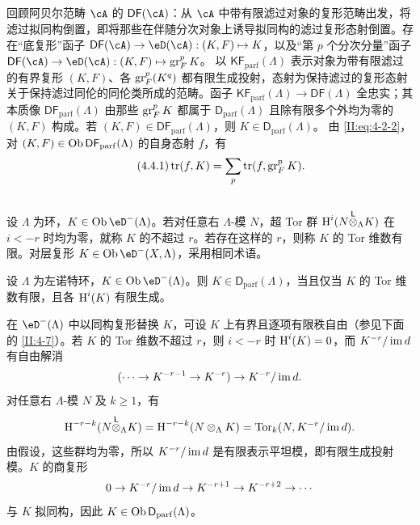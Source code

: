 \subsection{}\label{II:4-4}
回顾阿贝尔范畴 $\cA$ 的 $\mathsf{DF}(\cA)$：从 $\cA$ 中带有限滤过对象的复形范畴出发，将滤过拟同构倒置，即将那些在伴随分次对象上诱导拟同构的滤过复形态射倒置。存在“底复形”函子 $\mathsf{DF}(\cA)\to\eD(\cA):(K,F)\mapsto K$，以及“第 $p$ 个分次分量”函子 $\mathsf{DF}(\cA)\to\eD(\cA):(K,F)\mapsto\gr_F^pK$。
以 $\mathsf{KF}_{\mathrm{parf}}(\Lambda)$ 表示对象为带有限滤过的有界复形 $(K,F)$、各 $\operatorname{gr}_F^p(K^q)$ 都有限生成投射，态射为保持滤过的复形态射关于保持滤过同伦的同伦类所成的范畴。函子 $\mathsf{KF}_{\mathrm{parf}}(\Lambda)\to\mathsf{DF}(\Lambda)$ 全忠实；其本质像 $\mathsf{DF}_{\mathrm{parf}}(\Lambda)$ 由那些 $\operatorname{gr}_F^pK$ 都属于 $\mathsf D_{\mathrm{parf}}(\Lambda)$ 且除有限多个外均为零的 $(K,F)$ 构成。若 $(K,F)\in\mathsf{DF}_{\mathrm{parf}}(\Lambda)$，则 $K\in\mathsf D_{\mathrm{parf}}(\Lambda)$。
由 \eqref{II:eq:4-2-2}，对 $(K,F)\in\operatorname{Ob}\mathsf{DF}_{\mathrm{parf}}(\Lambda)$ 的自身态射 $f$，有
\begin{equation*}\tag{4.4.1}\label{II:eq:4-4-1}
\operatorname{tr}(f,K)=\sum_p\operatorname{tr}(f,\operatorname{gr}_F^pK).
\end{equation*}

\subsection{}\label{II:4-5}
设 $\Lambda$ 为环，$K\in\ob\eD^-(\Lambda)$。若对任意右 $\Lambda$-模 $N$，超 Tor 群 $\operatorname{H}^i(N{\overset{\mathsf{L}}{\otimes}}_\Lambda K)$ 在 $i<-r$ 时均为零，就称 $K$ 的不超过 $r$。若存在这样的 $r$，则称 $K$ 的 Tor 维数有限。对层复形 $K\in\ob\eD^-(X,\Lambda)$，采用相同术语。
\begin{lemma}\label{II:4-5-1}
设 $\Lambda$ 为左诺特环，$K\in\ob\eD^-(\Lambda)$。则 $K\in\mathsf D_{\mathrm{parf}}(\Lambda)$，当且仅当 $K$ 的 Tor 维数有限，且各 $\operatorname{H}^i(K)$ 有限生成。
\end{lemma}
在 $\eD^-(\Lambda)$ 中以同构复形替换 $K$，可设 $K$ 上有界且逐项有限秩自由（参见下面的 \ref{II:4-7}）。若 $K$ 的 Tor 维数不超过 $r$，则 $i<-r$ 时 $\operatorname{H}^i(K)=0$，而 $K^{-r}/\operatorname{im} d$ 有自由解消
\[(\cdots\to K^{-r-1}\to K^{-r})\to K^{-r}/\operatorname{im} d.\]
对任意右 $\Lambda$-模 $N$ 及 $k\geqslant1$，有
\[\operatorname{H}^{-r-k}(N{\overset{\mathsf{L}}{\otimes}}_\Lambda K)=\operatorname{H}^{-r-k}(N\otimes_\Lambda K)=\operatorname{Tor}_k(N,K^{-r}/\operatorname{im} d).\]
由假设，这些群均为零，所以 $K^{-r}/\operatorname{im} d$ 是有限表示平坦模，即有限生成投射模。$K$ 的商复形
\[0\to K^{-r}/\operatorname{im} d\to K^{-r+1}\to K^{-r+2}\to\cdots\]
与 $K$ 拟同构，因此 $K\in\operatorname{Ob}\mathsf D_{\mathrm{parf}}(\Lambda)$。

